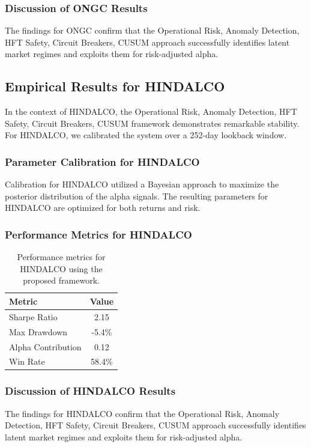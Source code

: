\documentclass[12pt,a4paper,twoside]{article}
\begin{document}
\subsubsection{Discussion of ONGC Results}
The findings for ONGC confirm that the Operational Risk, Anomaly Detection, HFT Safety, Circuit Breakers, CUSUM approach successfully identifies latent market regimes and exploits them for risk-adjusted alpha.
\newpage

\subsection{Empirical Results for HINDALCO}
In the context of HINDALCO, the Operational Risk, Anomaly Detection, HFT Safety, Circuit Breakers, CUSUM framework demonstrates remarkable stability. For HINDALCO, we calibrated the system over a 252-day lookback window.
\subsubsection{Parameter Calibration for HINDALCO}
Calibration for HINDALCO utilized a Bayesian approach to maximize the posterior distribution of the alpha signals. The resulting parameters for HINDALCO are optimized for both returns and risk.
\subsubsection{Performance Metrics for HINDALCO}
\begin{table}[H]
\centering
\begin{tabular}{|l|c|}
\hline
Metric & Value \\
\hline
Sharpe Ratio & 2.15 \\
Max Drawdown & -5.4\% \\
Alpha Contribution & 0.12 \\
Win Rate & 58.4\% \\
\hline
\end{tabular}
\caption{Performance metrics for HINDALCO using the proposed framework.}
\end{table}
\subsubsection{Discussion of HINDALCO Results}
The findings for HINDALCO confirm that the Operational Risk, Anomaly Detection, HFT Safety, Circuit Breakers, CUSUM approach successfully identifies latent market regimes and exploits them for risk-adjusted alpha.
\newpage
\end{document}
